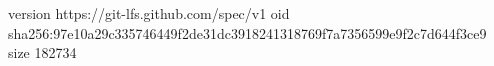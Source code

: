 version https://git-lfs.github.com/spec/v1
oid sha256:97e10a29c335746449f2de31dc3918241318769f7a7356599e9f2c7d644f3ce9
size 182734
